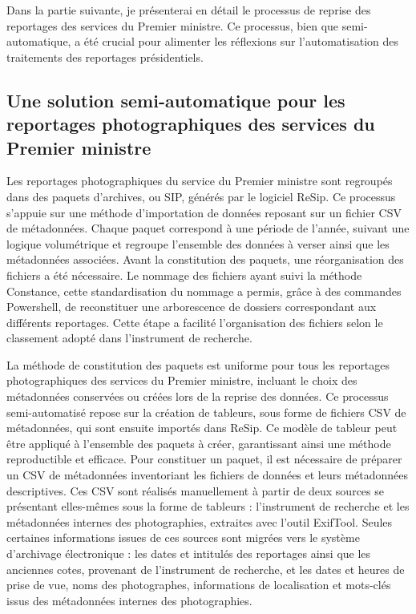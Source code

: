 Dans la partie suivante, je présenterai en détail le processus de reprise des reportages des services du Premier ministre. Ce processus, bien que semi-automatique, a été crucial pour alimenter les réflexions sur l’automatisation des traitements des reportages présidentiels. 

\subsection*{Une solution semi-automatique pour les reportages photographiques des services du Premier ministre}

Les reportages photographiques du service du Premier ministre sont regroupés dans des paquets d’archives, ou SIP, générés par le logiciel ReSip. Ce processus s’appuie sur une méthode d’importation de données reposant sur un fichier CSV de métadonnées. Chaque paquet correspond à une période de l’année, suivant une logique volumétrique et regroupe l’ensemble des données à verser ainsi que les métadonnées associées. Avant la constitution des paquets, une réorganisation des fichiers a été nécessaire. Le nommage des fichiers ayant suivi la méthode Constance, cette standardisation du nommage a permis, grâce à des commandes Powershell, de reconstituer une arborescence de dossiers correspondant aux différents reportages. Cette étape a facilité l’organisation des fichiers selon le classement adopté dans l’instrument de recherche.

La méthode de constitution des paquets est uniforme pour tous les reportages photographiques des services du Premier ministre, incluant le choix des métadonnées conservées ou créées lors de la reprise des données. Ce processus semi-automatisé repose sur la création de tableurs, sous forme de fichiers CSV de métadonnées, qui sont ensuite importés dans ReSip. Ce modèle de tableur peut être appliqué à l’ensemble des paquets à créer, garantissant ainsi une méthode reproductible et efficace. Pour constituer un paquet, il est nécessaire de préparer un CSV de métadonnées inventoriant les fichiers de données et leurs métadonnées descriptives. Ces CSV sont réalisés manuellement à partir de deux sources se présentant elles-mêmes sous la forme de tableurs : l’instrument de recherche et les métadonnées internes des photographies, extraites avec l’outil ExifTool. Seules certaines informations issues de ces sources sont migrées vers le système d’archivage électronique : les dates et intitulés des reportages ainsi que les anciennes cotes, provenant de l’instrument de recherche, et les dates et heures de prise de vue, noms des photographes, informations de localisation et mots-clés issus des métadonnées internes des photographies.

